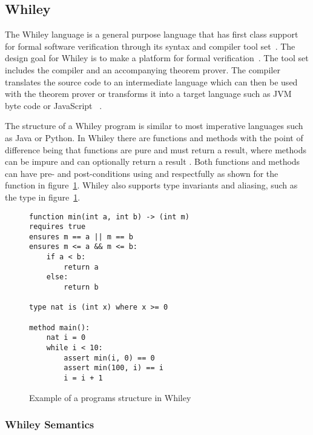 \subsection{Whiley}

The Whiley language is a general purpose language that has first class
support for formal software verification through its syntax and compiler
tool set~\cite{whiley-origin}.
The design goal for Whiley is to make a platform for formal verification~\cite{whiley-origin}.
The tool set includes the compiler and an accompanying theorem prover.
The compiler translates the source code to an intermediate language which
can then be used with the theorem prover or transforms it into a target
language such as JVM byte code or JavaScript~\cite{whiley-design}
\cite{wyil}.

The structure of a Whiley program is similar to most imperative languages
such as Java or Python.
In Whiley there are functions and methods with the point of difference being
that functions are pure and must return a result,
where methods can be impure and can optionally return a result
\cite{whiley-spec}\cite{whiley-design}.
Both functions and methods can have pre- and post-conditions using
 and  respectfully as shown for the 
function in figure~\ref{lst:whiley-exp}.
Whiley also supports type invariants and aliasing, such as the  type in
figure~\ref{lst:whiley-exp}.

\begin{figure}[ht]
\begin{lstlisting}
function min(int a, int b) -> (int m)
requires true
ensures m == a || m == b
ensures m <= a && m <= b:
    if a < b:
        return a
    else:
        return b

type nat is (int x) where x >= 0

method main():
    nat i = 0
    while i < 10:
        assert min(i, 0) == 0
        assert min(100, i) == i
        i = i + 1
\end{lstlisting}
\caption{Example of a programs structure in Whiley}
\label{lst:whiley-exp}
\end{figure}

\subsubsection{Whiley Semantics}

